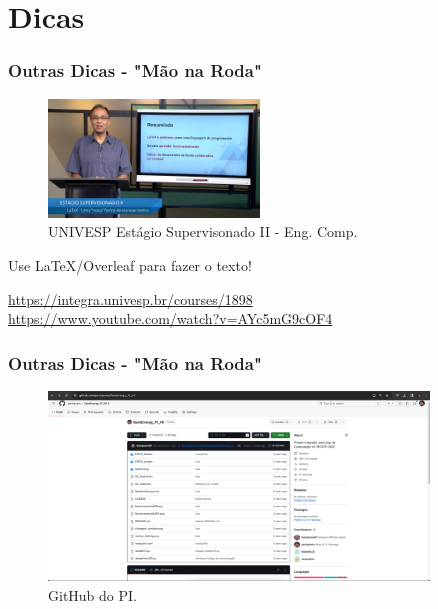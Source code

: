 \documentclass{beamer}
\begin{document}
\section{Dicas}
\begin{frame}
  \frametitle{Outras Dicas - "Mão na Roda"}
  \begin{block}{}
    \begin{figure}
      \centering
      \includegraphics[width=0.5\textwidth]{overleaf.png} %
      \captionsetup{labelformat=simple, labelsep=period}
      \caption{UNIVESP Estágio Supervisonado II - Eng. Comp.}
    \end{figure}
    
  \begin{center}
    Use LaTeX/Overleaf para fazer o texto!\\
  \end{center}
  \href{https://integra.univesp.br/courses/1898}{https://integra.univesp.br/courses/1898}\\
  
  \href{https://www.youtube.com/watch?v=AYc5mG9cOF4}{https://www.youtube.com/watch?v=AYc5mG9cOF4}\\
  
  \end{block}
\end{frame}

\begin{frame}
  \frametitle{Outras Dicas - "Mão na Roda"}
  \begin{block}{}
    \begin{figure}
      \centering
      \includegraphics[width=0.9\textwidth]{github_pi.png} %
      \captionsetup{labelformat=simple, labelsep=period}
      \caption{GitHub do PI.}
    \end{figure}
  \end{block}
\end{frame}
\end{document}
